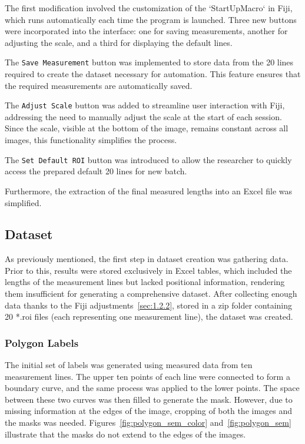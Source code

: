 The first modification involved the customization of the `StartUpMacro` in Fiji, which runs automatically each time the program is launched. Three new buttons were incorporated into the interface: one for saving measurements, another for adjusting the scale, and a third for displaying the default lines.

The \texttt{Save Measurement} button was implemented to store data from the 20 lines required to create the dataset necessary for automation. This feature ensures that the required measurements are automatically saved.

The \texttt{Adjust Scale} button was added to streamline user interaction with Fiji, addressing the need to manually adjust the scale at the start of each session. Since the scale, visible at the bottom of the image, remains constant across all images, this functionality simplifies the process.

The \texttt{Set Default ROI} button was introduced to allow the researcher to quickly access the prepared default 20 lines for new batch.

Furthermore, the extraction of the final measured lengths into an Excel file was simplified.

\subsection{Dataset}

As previously mentioned, the first step in dataset creation was gathering data. Prior to this, results were stored exclusively in Excel tables, which included the lengths of the measurement lines but lacked positional information, rendering them insufficient for generating a comprehensive dataset. After collecting enough data thanks to the Fiji adjustments~\ref{sec:1.2.2}, stored in a zip folder containing 20 *.roi files (each representing one measurement line), the dataset was created.

\subsubsection{Polygon Labels}

The initial set of labels was generated using measured data from ten measurement lines. The upper ten points of each line were connected to form a boundary curve, and the same process was applied to the lower points. The space between these two curves was then filled to generate the mask. However, due to missing information at the edges of the image, cropping of both the images and the masks was needed. Figures~\ref{fig:polygon_sem_color} and~\ref{fig:polygon_sem} illustrate that the masks do not extend to the edges of the images.


